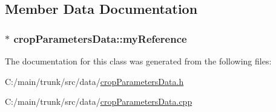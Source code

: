 \subsection{Member Data Documentation}
\hypertarget{classcrop_parameters_data_a43dc6c0c0c052b85f6e311b39224ede3}{
\subsubsection[{myReference}]{$\ast$ {\bf cropParametersData::myReference}}}
\label{classcrop_parameters_data_a43dc6c0c0c052b85f6e311b39224ede3}


The documentation for this class was generated from the following files:\begin{DoxyCompactItemize}
\item 
C:/main/trunk/src/data/\hyperlink{crop_parameters_data_8h}{cropParametersData.h}\item 
C:/main/trunk/src/data/\hyperlink{crop_parameters_data_8cpp}{cropParametersData.cpp}\end{DoxyCompactItemize}
